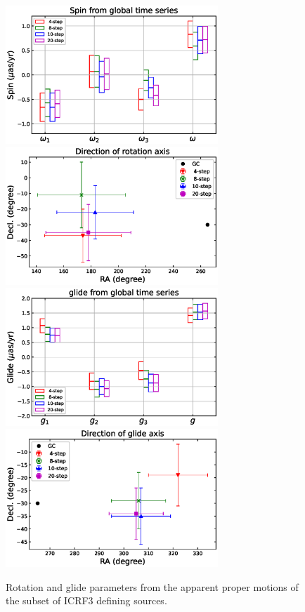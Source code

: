 \documentclass{aa-note}    %
\begin{document}
 \begin{figure}%
   \centering
   \includegraphics[width=80mm]{figs/spin-vs-nb-step-def} 
   \includegraphics[width=80mm]{figs/spin-axis-vs-nb-step-def} \\
   \includegraphics[width=80mm]{figs/glide-vs-nb-step-def} 
   \includegraphics[width=80mm]{figs/glide-axis-vs-nb-step-def}  
   \caption[]{\label{fig:spin-def} %
   Rotation and glide parameters from the apparent proper motions of the subset of ICRF3 defining sources.
   }
 \end{figure}
\end{document}
